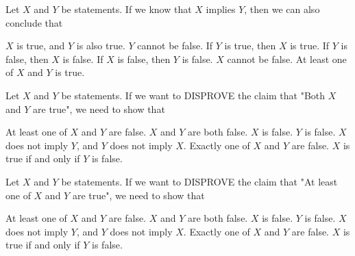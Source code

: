 \documentclass[twoside,a4paper,leqno]{article}
\begin{document}

\begin{esercizi*}{}

\begin{exerm}
  Let $X$ and $Y$ be statements.  If we know that $X$ implies $Y$, then we can also conclude that
\begin{rispm}[2] %
\risp $X$ is true, and $Y$ is also true.
\risp[-2]  %
$Y$ cannot be false.
\risp[3] If $Y$ is true, then $X$ is true.
\risp[=] 
If $Y$ is false, then $X$ is false.
\risp If $X$ is false, then $Y$ is false.
\risp $X$ cannot be false.
\risp[3.1415]
 At least one of $X$ and $Y$ is true.
\end{rispm}


\end{exerm}
\begin{exerm}
  Let $X$ and $Y$ be statements.  If we want to DISPROVE the claim that "Both $X$ and $Y$ are true", we need to show that
\begin{rispm}
\risp[=]  At least one of $X$ and $Y$ are false.
\risp $X$ and $Y$ are both false.
\risp[0.5] $X$ is false.
\risp[0.5] $Y$ is false.
\risp $X$ does not imply $Y$, and $Y$ does not imply $X$.
\risp Exactly one of $X$ and $Y$ are false.
\risp $X$ is true if and only if $Y$ is false.
\end{rispm}
\end{exerm}

\begin{exerm}
  Let $X$ and $Y$ be statements.  If we want to DISPROVE the claim that "At least one of $X$ and $Y$ are true", we need to show that
\begin{rispm}
\risp  At least one of $X$ and $Y$ are false.
\risp[=] $X$ and $Y$ are both false.
\risp $X$ is false.
\risp $Y$ is false.
\risp $X$ does not imply $Y$, and $Y$ does not imply $X$.
\risp Exactly one of $X$ and $Y$ are false.
\risp $X$ is true if and only if $Y$ is false.
\end{rispm}
\end{exerm}


\end{esercizi*}
\end{document}
